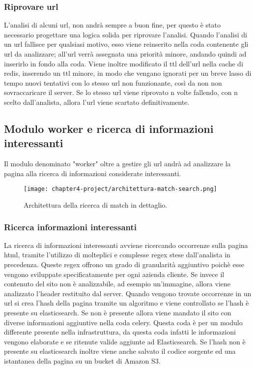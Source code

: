\subsubsection{Riprovare url}

L'analisi di alcuni url, non andrà sempre a buon fine, per questo è stato necessario progettare una logica solida per riprovare l'analisi. Quando l'analisi di un url fallisce per qualsiasi motivo, esso viene reinserito nella coda contenente gli url da analizzare; all'url verrà assegnata una priorità minore, andando quindi ad inserirlo in fondo alla coda. Viene inoltre modificato il ttl dell'url nella cache di redis, inserendo un ttl minore, in modo che vengano ignorati per un breve lasso di tempo nuovi tentativi con lo stesso url non funzionante, così da non non sovraccaricare il server. Se lo stesso url viene riprovato n volte fallendo, con n scelto dall'analista, allora l'url viene scartato definitivamente.


\subsection{Modulo worker e ricerca di informazioni interessanti}


Il modulo denominato "worker" oltre a gestire gli url andrà ad analizzare la pagina alla ricerca di informazioni considerate interessanti.
\begin{figure}[!h] 
    \centering 
    \texttt{[image: chapter4-project/architettura-match-search.png]} 
    \caption{Architettura della ricerca di match in dettaglio.}
\end{figure}

\subsubsection{Ricerca informazioni interessanti}

La ricerca di informazioni interessanti avviene ricercando occorrenze sulla pagina html, tramite l'utilizzo di molteplici e complesse regex stese dall'analista in precedenza. Queste regex offrono un grado di granularità aggiuntivo poichè esse vengono sviluppate specificatamente per ogni azienda cliente. Se invece il contenuto del sito non è analizzabile, ad esempio un'immagine, allora viene analizzato l'header restituito dal server. Quando vengono trovate occorrenze in un url si crea l'hash della pagina tramite un algoritmo e viene controllato se l'hash è presente su elasticsearch. Se non è presente allora viene mandato il sito con diverse informazioni aggiuntive nella coda celery. Questa coda è per un modulo differente presente nella infrastruttura, da questa coda infatti le informazioni vengono elaborate e se ritenute valide aggiunte ad Elasticsearch. \newline{}
Se l'hash non è presente su elasticsearch inoltre viene anche salvato il codice sorgente ed una istantanea della pagina su un bucket di Amazon S3.